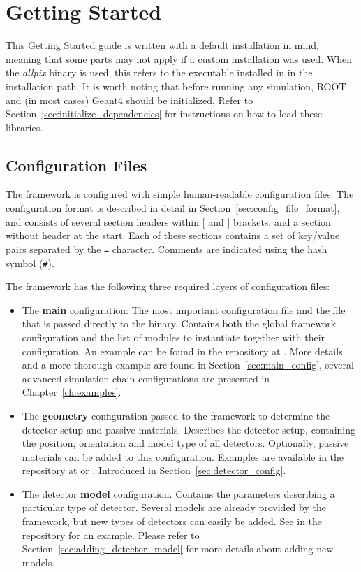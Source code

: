\chapter{Getting Started}
\label{ch:gettingstarted}

This Getting Started guide is written with a default installation in mind, meaning that some parts may not apply if a custom installation was used.
When the \textit{allpix} binary is used, this refers to the executable installed in  in the installation path.
It is worth noting that before running any \apsq simulation, ROOT and (in most cases) Geant4 should be initialized.
Refer to Section~\ref{sec:initialize_dependencies} for instructions on how to load these libraries.

\section{Configuration Files}
\label{sec:configuration_files}
The framework is configured with simple human-readable configuration files.
The configuration format is described in detail in Section~\ref{sec:config_file_format}, and consists of several section headers within $[$ and $]$ brackets, and a section without header at the start.
Each of these sections contains a set of key/value pairs separated by the \texttt{=} character.
Comments are indicated using the hash symbol (\texttt{\#}).

The framework has the following three required layers of configuration files:
\begin{itemize}
\item The \textbf{main} configuration: The most important configuration file and the file that is passed directly to the binary.
Contains both the global framework configuration and the list of modules to instantiate together with their configuration.
An example can be found in the repository at .
More details and a more thorough example are found in Section~\ref{sec:main_config}, several advanced simulation chain configurations are presented in Chapter~\ref{ch:examples}.
\item The \textbf{geometry} configuration passed to the framework to determine the detector setup and passive materials.
Describes the detector setup, containing the position, orientation and model type of all detectors.
Optionally, passive materials can be added to this configuration.
Examples are available in the repository at  or .
Introduced in Section~\ref{sec:detector_config}.
\item The detector \textbf{model} configuration.
Contains the parameters describing a particular type of detector.
Several models are already provided by the framework, but new types of detectors can easily be added.
See  in the repository for an example.
Please refer to Section~\ref{sec:adding_detector_model} for more details about adding new models.
\end{itemize}

